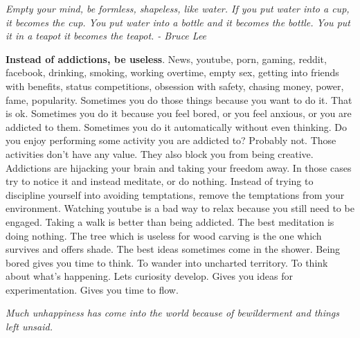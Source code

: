 \documentclass[a4paper,hidelinks]{article}
\begin{document}
\begin{center}
\textit{Empty your mind, be formless, shapeless, like water. If you put water into a cup, it becomes the cup. You put water into a bottle and it becomes the bottle. You put it in a teapot it becomes the teapot. - Bruce Lee}
\end{center}

\textbf{Instead of addictions, be useless}.
News, youtube, porn, gaming, reddit, facebook, drinking, smoking, working overtime, empty sex, getting into friends with benefits, status competitions, obsession with safety, chasing money, power, fame, popularity.
Sometimes you do those things because you want to do it.
That is ok.
Sometimes you do it because you feel bored, or you feel anxious, or you are addicted to them.
Sometimes you do it automatically without even thinking.
Do you enjoy performing some activity you are addicted to?
Probably not.
Those activities don't have any value.
They also block you from being creative.
Addictions are hijacking your brain and taking your freedom away.
In those cases try to notice it and instead meditate, or do nothing.
Instead of trying to discipline yourself into avoiding temptations, remove the temptations from your environment.
Watching youtube is a bad way to relax because you still need to be engaged.
Taking a walk is better than being addicted.
The best meditation is doing nothing.
The tree which is useless for wood carving is the one which survives and offers shade.
The best ideas sometimes come in the shower.
Being bored gives you time to think.
To wander into uncharted territory.
To think about what's happening.
Lets curiosity develop.
Gives you ideas for experimentation.
Gives you time to flow.

\newpage

\begin{center}
\textit{Much unhappiness has come into the world because of bewilderment and things left unsaid.}
\end{center}
\end{document}
